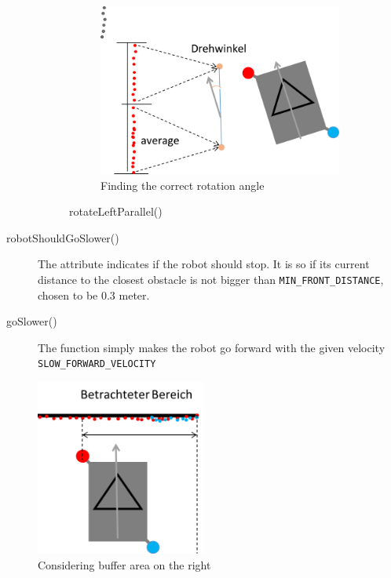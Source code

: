 \begin{description}
\begin{figure}[htb]
\begin{subfigure}{.65\textwidth}
	\centering
	\includegraphics[width=0.9\linewidth]{graphics/rotate_left_parallel02.png}
	\caption{Finding the correct rotation angle}
	\label{rotate_left_parallel02}
\centering
\end{subfigure}
\caption{rotateLeftParallel()}
\label{fig:side_by_side}
\end{figure}

\item[robotShouldGoSlower()]  The attribute indicates if the robot should stop. It is so if its current distance to the closest obstacle is not bigger than \texttt{MIN\_FRONT\_DISTANCE}, chosen to be 0.3 meter.

\item[goSlower()] The function simply makes the robot go forward with the given velocity \\ \texttt{SLOW\_FORWARD\_VELOCITY}

\end{description}

\begin{figure}[htb]
\centering
\includegraphics[width=0.5\textwidth]{graphics/betrachteter_bereich.png}
\caption{Considering buffer area on the right}
\label{betrachteter_bereich}
\centering
\end{figure}

